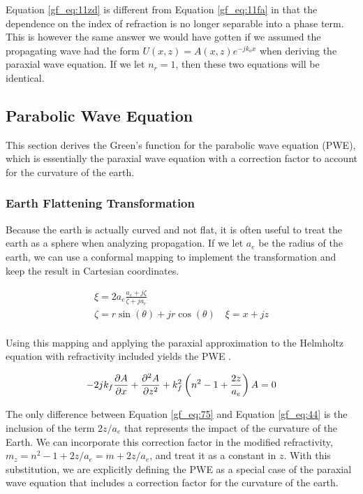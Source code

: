 Equation \ref{gf_eq:11zd} is different from Equation  \ref{gf_eq:11fa} in that the dependence on the index of refraction is no longer separable into a phase term. This is however the same answer we would have gotten if we assumed the propagating wave had the form $U(x,z) = A(x,z)e^{-jk_ox}$ when deriving the paraxial wave equation. If we let $n_r = 1$, then these two equations will be identical.

\subsection{Parabolic Wave Equation}
This section derives the Green's function for the parabolic wave equation (PWE), which is essentially the paraxial wave equation with a correction factor to account for the curvature of the earth.

\subsubsection{Earth Flattening Transformation}
Because the earth is actually curved and not flat, it is often useful to treat the earth as a sphere when analyzing propagation. If we let $a_e$ be the radius of the earth, we can use a conformal mapping to implement the transformation \cite{kuttler_pe_theory} and keep the result in Cartesian coordinates.

\begin{equation}
\begin{gathered} 
\xi = 2a_e\frac{a_e+j\zeta}{\zeta + ja_e} \\
\zeta = r\sin(\theta) + jr\cos(\theta)  \quad \xi=x+jz\\
\label{gf_eq:74}
\end{gathered}
\end{equation}
\renewcommand{\baselinestretch}{2} \small\normalsize

Using this mapping and applying the paraxial approximation to the Helmholtz equation with refractivity included yields the PWE \cite{kuttler_pe_theory} \cite{dockery_pe}.
 
\begin{equation}
-2jk_f\frac{\partial A}{\partial x} + \frac{\partial^2 A}{\partial z^2} +k_f^2\left(n^2-1+\frac{2z}{a_e} \right)A = 0 \\
\label{gf_eq:75}
\end{equation}
\renewcommand{\baselinestretch}{2} \small\normalsize

The only difference between Equation \ref{gf_eq:75} and Equation \ref{gf_eq:44} is the inclusion of the term $2z/a_e$ that represents the impact of the curvature of the Earth. We can incorporate this correction factor in the modified refractivity, $m_z = n^2-1 + 2z/a_e = m + 2z/a_e$, and treat it as a constant in $z$. With this substitution, we are explicitly defining the PWE as a special case of the paraxial wave equation that includes a correction factor for the curvature of the earth.

